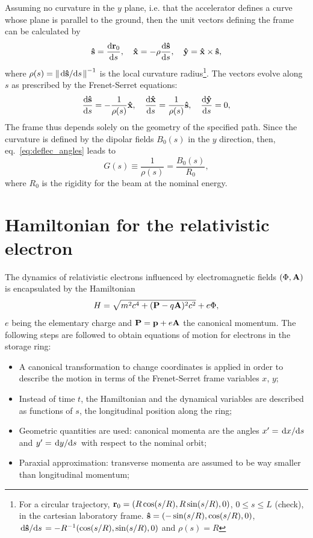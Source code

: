 Assuming no curvature in the $y$ plane, i.e. that the accelerator defines a curve whose plane is parallel to the ground, then the unit vectors defining the frame can be calculated by\cite{lee}
\begin{equation}
\vu{s}=\dv{\vb{r}_{0}}{s}, \quad \vu{x}=-\rho\dv{\vu{s}}{s}, \quad \vu{y} =  \vu{x}\times\vu{s},
\end{equation}
where $\rho(s) = \norm{\dv*{\vu{s}}{s}}^{-1}$ is the local curvature radius\footnote{For a circular trajectory, $\vb{r}_0 = (R\cos(s/R), R\sin(s/R), 0)$, $ 0\leq s \leq L$ (check), in the cartesian laboratory frame. $\vu{s}=(-\sin(s/R), \cos(s/R), 0)$, $\dv*{\vu{s}}{s} = -R^{-1}(\cos(s/R),\sin(s/R), 0 )$ and $\rho(s)=R$}. The vectors evolve along $s$ as prescribed by the Frenet-Serret equations:
\begin{equation}
\dv{\vu{s}}{s}=-\frac{1}{\rho(s)}\vu{x}, \quad\dv{\vu{x}}{s}=\frac{1}{\rho(s)}\vu{s}, \quad \dv{\vu{y}}{s}=0,
\end{equation}
The frame thus depends solely on the geometry of the specified path. Since the curvature is defined by the dipolar fields $B_0(s)$ in the $y$ direction, then, eq.~\eqref{eq:deflec_angles} leads to
    \begin{equation}
        G(s) \equiv \frac{1}{\rho(s)} = \frac{B_0(s)}{R_0},
        \label{eq:G}
    \end{equation}
where $R_0$ is the rigidity for the beam at the nominal energy.
\section{Hamiltonian for the relativistic electron}
The dynamics of relativistic electrons influenced by electromagnetic fields $(\Phi, \vb{A})$ is encapsulated by the Hamiltonian
    \begin{equation*}
        H=\sqrt{m^2c^4+(\vb{P}-q\vb{A})^2c^2}+e\Phi,
    \end{equation*}
 $e$ being the elementary charge and $\vb{P}=\vb{p}+e\vb{A}$ the canonical momentum. The following steps are followed to obtain equations of motion for electrons in the storage ring:
 \begin{itemize}
    \item A canonical transformation to change coordinates is applied in order to describe the motion in terms of the Frenet-Serret frame variables $x$, $y$;
    \item Instead of time $t$, the Hamiltonian and the dynamical variables are described as functions of $s$, the longitudinal position along the ring;
    \item Geometric quantities are used: canonical momenta are the angles $x^\prime = \dv*{x}{s}$ and $y^\prime = \dv*{y}{s}$ with respect to the nominal orbit;
    \item Paraxial approximation: transverse momenta are assumed to be way smaller than longitudinal momentum;
 \end{itemize}

